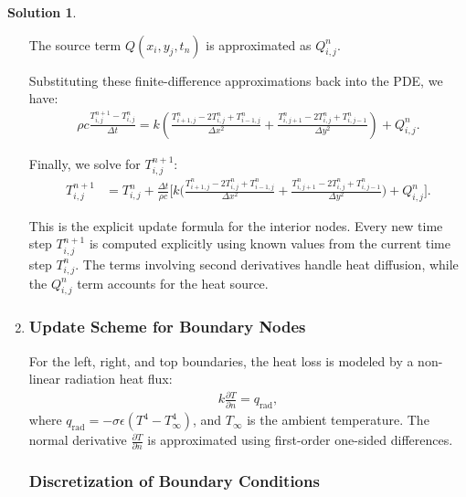 \documentclass[12pt]{article}
\theoremstyle{definition} %
\newtheorem{solution}{Solution}
\theoremstyle{plain} %
\begin{document}
\begin{solution}
\begin{enumerate}
         The source term $Q(x_i,y_j,t_n)$ is approximated as $Q_{i,j}^n$.
        
         Substituting these finite-difference approximations back into the PDE, we have:
        \begin{align}
        \rho c \frac{T_{i,j}^{n+1} - T_{i,j}^n}{\Delta t} = k \left( \frac{T_{i+1,j}^n - 2T_{i,j}^n + T_{i-1,j}^n}{\Delta x^2} + \frac{T_{i,j+1}^n - 2T_{i,j}^n + T_{i,j-1}^n}{\Delta y^2} \right) + Q_{i,j}^n.
        \end{align}
        
         Finally, we solve for $T_{i,j}^{n+1}$:
        \begin{align}
        T_{i,j}^{n+1} &= T_{i,j}^n + \frac{\Delta t}{\rho c}\bigg[ k\bigg( \frac{T_{i+1,j}^n - 2T_{i,j}^n + T_{i-1,j}^n}{\Delta x^2} + \frac{T_{i,j+1}^n - 2T_{i,j}^n + T_{i,j-1}^n}{\Delta y^2} \bigg) + Q_{i,j}^n \bigg]. \label{eqn7}
        \end{align}
        
         This is the explicit update formula for the interior nodes. Every new time step $T_{i,j}^{n+1}$ is computed explicitly using known values from the current time step $T_{i,j}^n$. The terms involving second derivatives handle heat diffusion, while the $Q_{i,j}^n$ term accounts for the heat source.

        \item \subsubsection*{Update Scheme for Boundary Nodes}

        For the left, right, and top boundaries, the heat loss is modeled by a non-linear radiation heat flux:
        \begin{align}
        k \frac{\partial T}{\partial n} = q_\text{rad},
        \end{align}
        where $q_\text{rad} = -\sigma \epsilon \left( T^4 - T_\infty^4 \right)$, and $T_\infty$ is the ambient temperature. The normal derivative $\frac{\partial T}{\partial n}$ is approximated using first-order one-sided differences.
        
        \subsubsection*{Discretization of Boundary Conditions}
        

\end{enumerate}
\end{solution}
\end{document}
